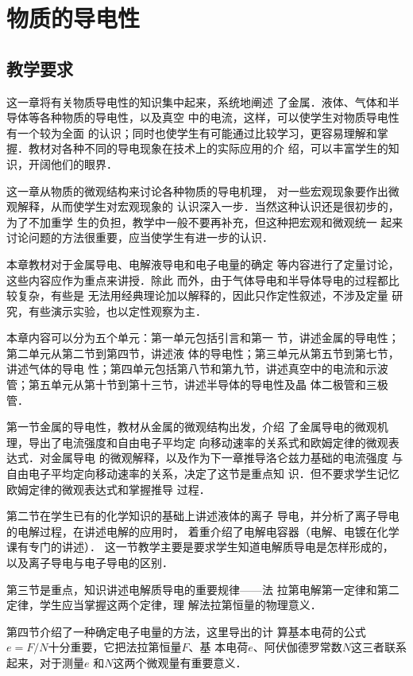 \chapter{物质的导电性}\minitoc[n]
\section{教学要求}
这一章将有关物质导电性的知识集中起来，系统地阐述
了金属．液体、气体和半导体等各种物质的导电性，以及真空
中的电流，这样，可以使学生对物质导电性有一个较为全面
的认识；同时也使学生有可能通过比较学习，更容易理解和掌
握．教材对各种不同的导电现象在技术上的实际应用的介
绍，可以丰富学生的知识，开阔他们的眼界．

这一章从物质的微观结构来讨论各种物质的导电机理，
对一些宏观现象要作出微观解释，从而使学生对宏观现象的
认识深入一步．当然这种认识还是很初步的，为了不加重学
生的负担，教学中一般不要再补充，但这种把宏观和微观统一
起来讨论问题的方法很重要，应当使学生有进一步的认识．

本章教材对于金属导电、电解液导电和电子电量的确定
等内容进行了定量讨论，这些内容应作为重点来讲授．除此
而外，由于气体导电和半导体导电的过程都比较复杂，有些是
无法用经典理论加以解释的，因此只作定性叙述，不涉及定量
研究，有些演示实验，也以定性观察为主．

本章内容可以分为五个单元：第一单元包括引言和第一
节，讲述金属的导电性；第二单元从第二节到第四节，讲述液
体的导电性；第三单元从第五节到第七节，讲述气体的导电
性；第四单元包括第八节和第九节，讲述真空中的电流和示波
管；第五单元从第十节到第十三节，讲述半导体的导电性及晶
体二极管和三极管．

第一节金属的导电性，教材从金属的微观结构出发，介绍
了金属导电的微观机理，导出了电流强度和自由电子平均定
向移动速率的关系式和欧姆定律的微观表达式．对金属导电
的微观解释，以及作为下一章推导洛仑兹力基础的电流强度
与自由电子平均定向移动速率的关系，决定了这节是重点知
识．但不要求学生记忆欧姆定律的微观表达式和掌握推导
过程．

第二节在学生已有的化学知识的基础上讲述液体的离子
导电，并分析了离子导电的电解过程，在讲述电解的应用时，
着重介绍了电解电容器（电解、电镀在化学课有专门的讲述）．
这一节教学主要是要求学生知道电解质导电是怎样形成的，
以及离子导电与电子导电的区别．

第三节是重点，知识讲述电解质导电的重要规律——法
拉第电解第一定律和第二定律，学生应当掌握这两个定律，理
解法拉第恒量的物理意义．

第四节介绍了一种确定电子电量的方法，这里导出的计
算基本电荷的公式$e=F/N$十分重要，它把法拉第恒量$F$、基
本电荷$e$、阿伏伽德罗常数$N$这三者联系起来，对于测量$e$
和$N$这两个微观量有重要意义．

